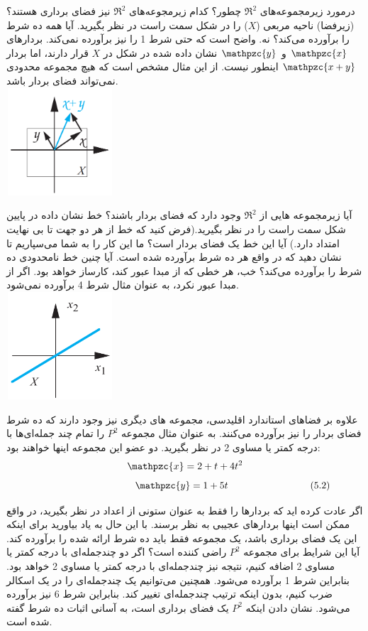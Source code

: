 \documentclass[a4paper,12pt]{report}
\begin{document}
	درمورد زیرمجموعه‌های $ \Re^2 $ چطور؟ کدام زیرمجوعه‌های $ \Re^2 $ نیز فضای برداری هستند؟(زیرفضا) ناحیه مربعی ($ X $) را در شکل سمت راست در نظر بگیرید. آیا همه ده شرط را برآورده می‌کند؟ نه. واضح است که حتی شرط 1 را نیز برآورده نمی‌کند. بردارهای $ \mathpzc{x} $ و $ \mathpzc{y} $ نشان داده شده در شکل در $ X $ قرار دارند، اما بردار $ \mathpzc{x+y} $ اینطور نیست. از این مثال مشخص است که هیچ مجموعه محدودی نمی‌تواند فضای بردار باشد.\\
	\marginpar
	{
		\includegraphics[width=4cm, height=4cm]{124-2}	
	}
	
	آیا زیرمجموعه هایی از $ \Re^2 $ وجود دارد که فضای بردار باشند؟ خط نشان داده در پایین شکل سمت راست را در نظر بگیرید.(فرض کنید که خط از هر دو جهت تا بی نهایت امتداد دارد.) آیا این خط یک فضای بردار است؟ ما این کار را به شما می‌سپاریم تا نشان دهید که در واقع هر ده شرط برآورده شده است. آیا چنین خط نامحدودی ده شرط را برآورده می‌کند؟ خب، هر خطی که از مبدا عبور کند، کارساز خواهد بود. اگر از مبدا عبور نكرد، به عنوان مثال شرط 4 برآورده نمی‌شود.\\
	\marginpar
	{
		\includegraphics[width=4cm, height=4cm]{124-3}	
	}

	علاوه بر فضاهای استاندارد اقلیدسی، مجموعه های دیگری نیز وجود دارند که ده شرط فضای بردار را نیز برآورده می‌کنند. به عنوان مثال مجموعه $ P^2 $ را تمام چند جمله‌ای‌ها با درجه کمتر یا مساوی 2 در نظر بگیرید. دو   عضو این مجموعه اینها خواهند بود:\\
	$$
	\mathpzc{x}=2+t+4t^2
	$$
	$$
	\hspace{3.5cm} \mathpzc{y}=1+5t \hspace{3cm}  (5.2)
	$$
	
	اگر عادت کرده اید که بردارها را فقط به عنوان ستونی از اعداد در نظر بگیرید، در واقع ممکن است اینها بردارهای عجیبی به نظر برسند. با این حال به یاد بیاورید برای اینکه این یک فضای برداری باشد، یک مجموعه فقط باید ده شرط ارائه شده را برآورده کند. آیا این شرایط برای مجموعه $ P^2 $ راضی کننده است؟ اگر دو چندجمله‌ای با درجه کمتر یا مساوی 2 اضافه کنیم، نتیجه نیز چندجمله‌ای با درجه کمتر یا مساوی 2 خواهد بود. بنابراین شرط 1 برآورده می‌شود. همچنین می‌توانیم یک چندجمله‌ای را در یک اسکالر ضرب کنیم، بدون اینکه ترتیب چندجمله‌ای تغییر کند. بنابراین شرط 6 نیز برآورده می‌شود. نشان دادن اینکه $ P^2 $ یک فضای برداری است، به آسانی اثبات ده شرط گفته شده است.
\end{document}
